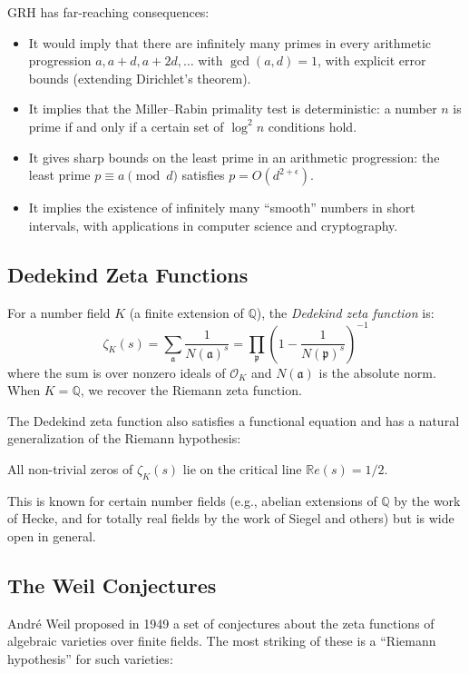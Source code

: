 GRH has far-reaching consequences:
\begin{itemize}
  \item It would imply that there are infinitely many primes in every arithmetic progression $a, a+d, a+2d, \ldots$ with $\gcd(a, d) = 1$, with explicit error bounds (extending Dirichlet's theorem).
  \item It implies that the Miller--Rabin primality test is deterministic: a number $n$ is prime if and only if a certain set of $\log^2 n$ conditions hold.
  \item It gives sharp bounds on the least prime in an arithmetic progression: the least prime $p \equiv a \pmod{d}$ satisfies $p = O(d^{2+\epsilon})$.
  \item It implies the existence of infinitely many ``smooth'' numbers in short intervals, with applications in computer science and cryptography.
\end{itemize}

\subsection{Dedekind Zeta Functions}

For a number field $K$ (a finite extension of $\mathbb{Q}$), the \textit{Dedekind zeta function} is:
\[
\zeta_K(s) = \sum_{\mathfrak{a}} \frac{1}{N(\mathfrak{a})^s} = \prod_{\mathfrak{p}} \left(1 - \frac{1}{N(\mathfrak{p})^s}\right)^{-1}
\]
where the sum is over nonzero ideals of $\mathcal{O}_K$ and $N(\mathfrak{a})$ is the absolute norm. When $K = \mathbb{Q}$, we recover the Riemann zeta function.

The Dedekind zeta function also satisfies a functional equation and has a natural generalization of the Riemann hypothesis:

\begin{conjecture}
All non-trivial zeros of $\zeta_K(s)$ lie on the critical line $\mathbb{R}e(s) = 1/2$.
\end{conjecture}

This is known for certain number fields (e.g., abelian extensions of $\mathbb{Q}$ by the work of Hecke, and for totally real fields by the work of Siegel and others) but is wide open in general.

\subsection{The Weil Conjectures}

Andr\'{e} Weil proposed in 1949 a set of conjectures about the zeta functions of algebraic varieties over finite fields. The most striking of these is a ``Riemann hypothesis'' for such varieties:

